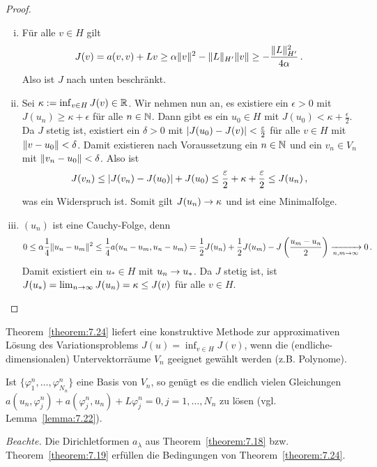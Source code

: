 \begin{proof}
  \begin{enumerate}[(i)]
  \item Für alle $v\in H$ gilt
    \begin{dmath*}
      J(v)=a(v,v)+Lv\geq\alpha\norm v^2-\norm L_{H'}\norm v\geq -\frac{\norm L_{H'}^2}{4\alpha}\, .
    \end{dmath*}
    Also ist $J$ nach unten beschränkt.
  \item Sei $\kappa:=\inf_{v\in H} J(v)\in\mathbb{R}$. Wir nehmen nun an, es existiere ein $\epsilon>0$ mit $J(u_n)\geq\kappa+\epsilon$ für alle $n\in\mathbb{N}$. Dann gibt es ein $u_0\in H$ mit $J(u_0)<\kappa+\frac\epsilon 2$. Da $J$ stetig ist, existiert ein $\delta>0$ mit $\lvert J(u_0)-J(v)\rvert<\frac{\varepsilon}2$ für alle $v\in H$ mit $\lVert v-u_0\rVert<\delta$. Damit existieren nach Voraussetzung ein $n\in\mathbb{N}$ und ein $v_n\in V_n$ mit $\lVert v_n-u_0\rVert<\delta$. Also ist
    \begin{dmath*}
      J(v_n)\leq\abs{J(v_n)-J(u_0)}+J(u_0)\leq\frac\epsilon2+\kappa+\frac\epsilon2\leq J(u_n)\, ,
    \end{dmath*}
    was ein Widerspruch ist. Somit gilt $J(u_n)\rightarrow\kappa$ und ist eine Minimalfolge.
  \item $(u_n)$ ist eine Cauchy-Folge, denn
   \begin{dmath*}
   0 \leq    \alpha\frac14\norm{u_n-u_m}^2\leq\frac14a(u_n-u_m,u_n-u_m)
      =\frac12J(u_n)+\frac12J(u_m)-J\left(\frac{u_m-u_n}{2}\right)
      \xrightarrow[n,m\ra\infty]{}0\, .
    \end{dmath*}
    Damit existiert ein $u_*\in H$ mit $u_n\rightarrow u_*$. Da $J$ stetig ist, ist $J(u_*)=\lim_{n\rightarrow \infty} J(u_n)=\kappa\leq J(v)$ für alle $v\in H$.\qedhere
  \end{enumerate}
\end{proof}

\begin{bem*}
Theorem~\ref{theorem:7.24} liefert eine konstruktive Methode zur approximativen Lösung des Variationsproblems $J(u) = \inf_{v \in H} J(v)$, wenn die (endliche-dimensionalen) Untervektorräume $V_n$ geeignet gewählt werden (z.B. Polynome).

Ist $\{\varphi^n_1, \ldots, \varphi_{N_n}^n\}$ eine Basis von $V_n$, so genügt es die endlich vielen Gleichungen $a(u_n, \varphi^n_j) + a(\varphi^n_j, u_n) + L\varphi_j^n = 0, j = 1, \ldots, N_n$ zu lösen (vgl. Lemma~\ref{lemma:7.22}).
\end{bem*}

\textit{Beachte.} Die Dirichletformen $a_\lambda$ aus Theorem~\ref{theorem:7.18} bzw. Theorem~\ref{theorem:7.19} erfüllen die Bedingungen von Theorem~\ref{theorem:7.24}.

